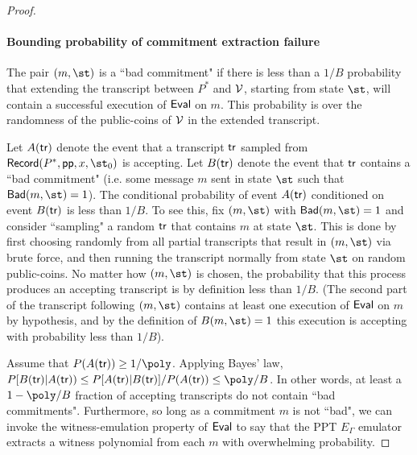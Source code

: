 \begin{proof}
\paragraph{Bounding probability of commitment extraction failure} 
The pair $(m, \st)$ is a ``bad commitment" if there is less than a $1/B$ probability that extending the transcript between $P^*$ and $\mathcal{V}$, starting from state $\st$, will contain a successful execution of $\textsf{{Eval}}$ on $m$. This probability is over the randomness of the public-coins of $\mathcal{V}$ in the extended transcript. %

Let $A(\textsf{{tr}})$ denote the event that a transcript $\textsf{{tr}}$ sampled from $\pro{Record}(P^*, \params, x, \st_0)$ is accepting. Let $B(\textsf{{tr}})$ denote the event that $\textsf{{tr}}$ contains a ``bad commitment" (i.e. some message $m$ sent in state $\st$ such that $\pro{Bad}(m, \st) = 1$). The conditional probability of event $A(\textsf{{tr}})$ conditioned on event $B(\textsf{{tr}})$ is less than $1/B$. To see this, fix $(m, \st)$ with $\pro{Bad}(m, \st) = 1$ and consider ``sampling" a random $\textsf{{tr}}$ that contains $m$ at state $\st$. This is done by first choosing randomly from all partial transcripts that result in $(m, \st)$ via brute force, and then running the transcript normally from state $\st$ on random public-coins. No matter how $(m, \st)$ is chosen, the probability that this process produces an accepting transcript is by definition less than $1/B$. (The second part of the transcript following $(m, \st)$ contains at least one execution of $\textsf{{Eval}}$ on $m$ by hypothesis, and by the definition of $B(m, \st) = 1$ this execution is accepting with probability less than $1/B$).

Assume that $P(A(\tr)) \geq 1/\poly$. Applying Bayes' law, %
$P[B(\tr) | A(\tr)) \leq P[A(\tr) | B(\tr)] / P(A(\tr)) \leq \poly / B$. 
In other words, at least a $1 - \poly/B$ fraction of accepting transcripts do not contain ``bad commitments". %
Furthermore, so long as a commitment $m$ is not ``bad", we can invoke the witness-emulation property of $\textsf{{Eval}}$ to say that the PPT $E_\Gamma$ emulator extracts a witness polynomial from each $m$ with overwhelming probability.


\end{proof}
